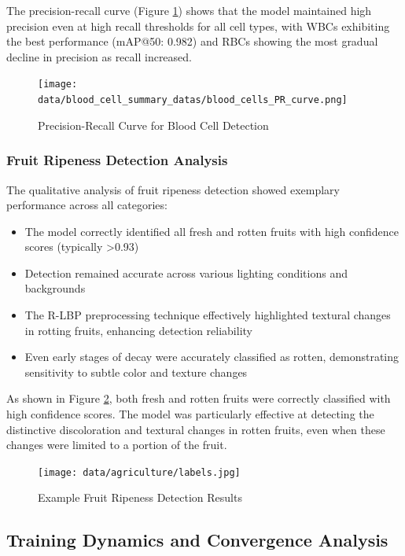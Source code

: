 \begin{multicols}{2}
The precision-recall curve (Figure \ref{fig:blood_cell_pr}) shows that the model maintained high precision even at high recall thresholds for all cell types, with WBCs exhibiting the best performance (mAP@50: 0.982) and RBCs showing the most gradual decline in precision as recall increased.

\begin{figure}[h]
\centering
\texttt{[image: data/blood\_cell\_summary\_datas/blood\_cells\_PR\_curve.png]}
\caption{Precision-Recall Curve for Blood Cell Detection}
\label{fig:blood_cell_pr}
\end{figure}

\subsubsection{Fruit Ripeness Detection Analysis}

The qualitative analysis of fruit ripeness detection showed exemplary performance across all categories:

\begin{itemize}
    \item The model correctly identified all fresh and rotten fruits with high confidence scores (typically >0.93)
    \item Detection remained accurate across various lighting conditions and backgrounds
    \item The R-LBP preprocessing technique effectively highlighted textural changes in rotting fruits, enhancing detection reliability
    \item Even early stages of decay were accurately classified as rotten, demonstrating sensitivity to subtle color and texture changes
\end{itemize}

As shown in Figure \ref{fig:fruit_examples}, both fresh and rotten fruits were correctly classified with high confidence scores. The model was particularly effective at detecting the distinctive discoloration and textural changes in rotten fruits, even when these changes were limited to a portion of the fruit.

\begin{figure}[h]
\centering
\texttt{[image: data/agriculture/labels.jpg]}
\caption{Example Fruit Ripeness Detection Results}
\label{fig:fruit_examples}
\end{figure}

\subsection{Training Dynamics and Convergence Analysis}


\end{multicols}
